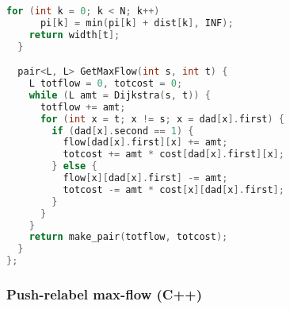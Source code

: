 \begin{lstlisting}[language=C++]
    for (int k = 0; k < N; k++)
      pi[k] = min(pi[k] + dist[k], INF);
    return width[t];
  }

  pair<L, L> GetMaxFlow(int s, int t) {
    L totflow = 0, totcost = 0;
    while (L amt = Dijkstra(s, t)) {
      totflow += amt;
      for (int x = t; x != s; x = dad[x].first) {
        if (dad[x].second == 1) {
          flow[dad[x].first][x] += amt;
          totcost += amt * cost[dad[x].first][x];
        } else {
          flow[x][dad[x].first] -= amt;
          totcost -= amt * cost[x][dad[x].first];
        }
      }
    }
    return make_pair(totflow, totcost);
  }
};

\end{lstlisting}
\subsubsection{Push-relabel max-flow (C++)}
